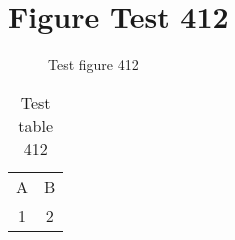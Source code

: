 \documentclass{article}
\begin{document}
\section{Figure Test 412}
\begin{figure}[h]
\caption{Test figure 412}
\end{figure}
\begin{table}[h]
\caption{Test table 412}
\begin{tabular}{cc}
A & B \\
1 & 2
\end{tabular}
\end{table}
\end{document}
